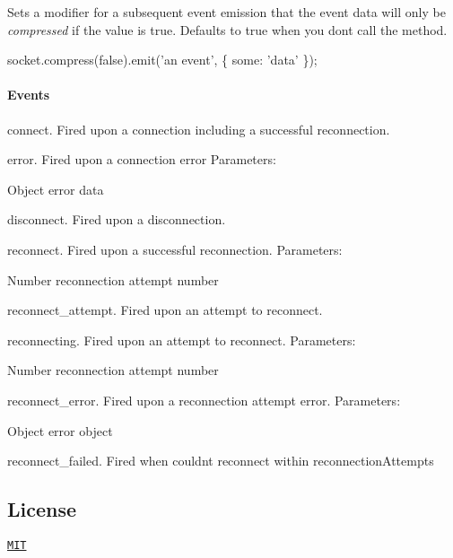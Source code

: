 Sets a modifier for a subsequent event emission that the event data will only be {\itshape compressed} if the value is {\ttfamily true}. Defaults to {\ttfamily true} when you don\textquotesingle{}t call the method.


\begin{DoxyCode}
socket.compress(false).emit('an event', \{ some: 'data' \});
\end{DoxyCode}


\paragraph*{Events}


\begin{DoxyItemize}
\item {\ttfamily connect}. Fired upon a connection including a successful reconnection.
\item {\ttfamily error}. Fired upon a connection error Parameters\+:
\begin{DoxyItemize}
\item {\ttfamily Object} error data
\end{DoxyItemize}
\item {\ttfamily disconnect}. Fired upon a disconnection.
\item {\ttfamily reconnect}. Fired upon a successful reconnection. Parameters\+:
\begin{DoxyItemize}
\item {\ttfamily Number} reconnection attempt number
\end{DoxyItemize}
\item {\ttfamily reconnect\+\_\+attempt}. Fired upon an attempt to reconnect.
\item {\ttfamily reconnecting}. Fired upon an attempt to reconnect. Parameters\+:
\begin{DoxyItemize}
\item {\ttfamily Number} reconnection attempt number
\end{DoxyItemize}
\item {\ttfamily reconnect\+\_\+error}. Fired upon a reconnection attempt error. Parameters\+:
\begin{DoxyItemize}
\item {\ttfamily Object} error object
\end{DoxyItemize}
\item {\ttfamily reconnect\+\_\+failed}. Fired when couldn\textquotesingle{}t reconnect within {\ttfamily reconnection\+Attempts}
\end{DoxyItemize}

\subsection*{License}

\href{/LICENSE}{\tt M\+IT} 